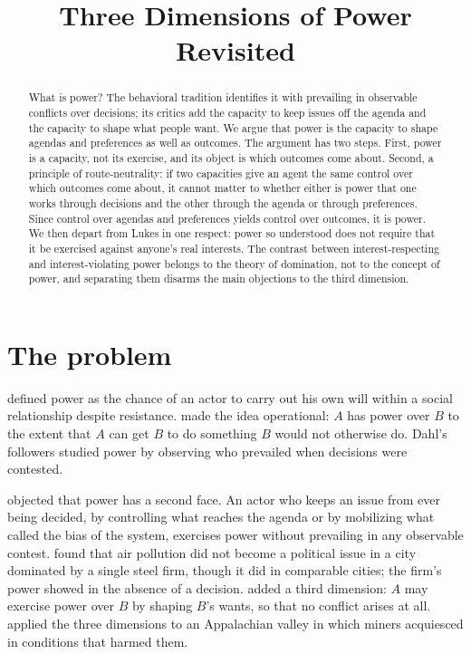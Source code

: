 \documentclass{situationist-preprint}
\title{Three Dimensions of Power Revisited}
\begin{document}
\maketitle

\begin{abstract}
What is power? The behavioral tradition identifies it with prevailing in observable conflicts over decisions; its critics add the capacity to keep issues off the agenda and the capacity to shape what people want. We argue that power is the capacity to shape agendas and preferences as well as outcomes. The argument has two steps. First, power is a capacity, not its exercise, and its object is which outcomes come about. Second, a principle of route-neutrality: if two capacities give an agent the same control over which outcomes come about, it cannot matter to whether either is power that one works through decisions and the other through the agenda or through preferences. Since control over agendas and preferences yields control over outcomes, it is power. We then depart from Lukes in one respect: power so understood does not require that it be exercised against anyone's real interests. The contrast between interest-respecting and interest-violating power belongs to the theory of domination, not to the concept of power, and separating them disarms the main objections to the third dimension.
\end{abstract}

\section{The problem}

\citet[ch.~1, §16]{Weber1922} defined power as the chance of an actor to carry out his own will within a social relationship despite resistance. \citet{Dahl1957} made the idea operational: $A$ has power over $B$ to the extent that $A$ can get $B$ to do something $B$ would not otherwise do. Dahl's followers studied power by observing who prevailed when decisions were contested.

\citet{Bachrach1962} objected that power has a second face. An actor who keeps an issue from ever being decided, by controlling what reaches the agenda or by mobilizing what \citet{Schattschneider1960} called the bias of the system, exercises power without prevailing in any observable contest. \citet{Crenson1971} found that air pollution did not become a political issue in a city dominated by a single steel firm, though it did in comparable cities; the firm's power showed in the absence of a decision. \citet{Lukes1974,Lukes2005} added a third dimension: $A$ may exercise power over $B$ by shaping $B$'s wants, so that no conflict arises at all. \citet{Gaventa1980} applied the three dimensions to an Appalachian valley in which miners acquiesced in conditions that harmed them.
\end{document}
